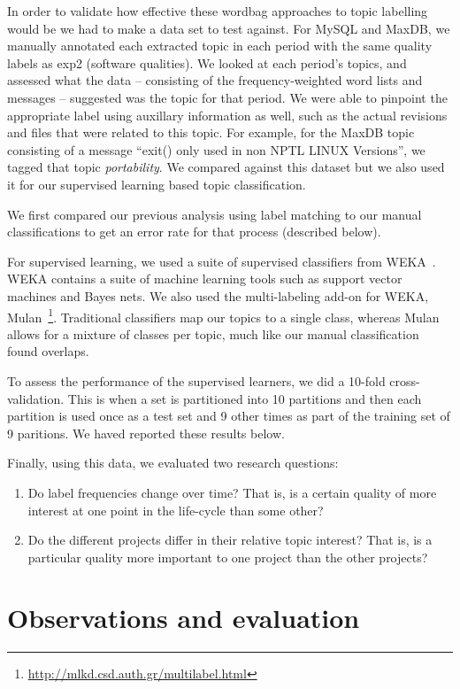 \documentclass{acm_proc_article-sp}
\begin{document}
In order to validate how effective these wordbag approaches to topic labelling would be we had to make a data set to test against.  For MySQL and MaxDB, we manually annotated each extracted topic in each period with the same quality labels as \textsf{exp2} (software qualities). We looked at each period's topics, and assessed what the data -- consisting of the frequency-weighted word lists and messages -- suggested was the topic for that period. We were able to pinpoint the appropriate label using auxillary information as well, such as the actual revisions and files that were related to this topic. For example, for the MaxDB topic consisting of a message ``exit() only used in non NPTL LINUX Versions'', we tagged that topic \emph{portability}. We compared against this dataset but we also used it for our supervised learning based topic classification.

We first compared our previous analysis using label matching to our manual classifications to get an error rate for that process (described below). 

For supervised learning, we used a suite of supervised classifiers from WEKA~\cite{weka09}. WEKA contains a suite of machine learning tools such as support vector machines and Bayes nets. We also used the multi-labeling add-on for WEKA, Mulan~\cite{mulan}\footnote{\url{http://mlkd.csd.auth.gr/multilabel.html}}. Traditional classifiers map our topics to a single class, whereas Mulan allows for a mixture of classes per topic, much like our manual classification found overlaps. 

To assess the performance of the supervised learners, we did a 10-fold cross-validation. This is when a set is partitioned into 10 partitions and then each partition is used once as a test set and 9 other times as part of the training set of 9 paritions. We haved reported these results below.

Finally, using this data, we evaluated two research questions:
\begin{enumerate}
\item Do label frequencies change over time? That is, is a certain quality of more interest at one point in the life-cycle than some other? 
\item  Do the different projects differ in their relative topic interest? That is, is a particular quality more important to one project than the other projects?  
\end{enumerate}

\section{Observations and evaluation}
\end{document}
